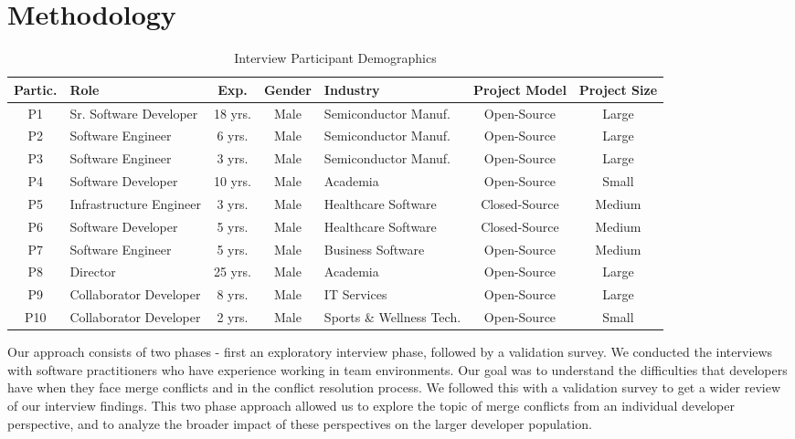 \section{Methodology}\label{methodology}

\begin{table*}[!t]
\renewcommand{\arraystretch}{1.3}
\caption{Interview Participant Demographics}
\label{interview_demographics}
\centering
\begin{tabularx}{\textwidth}{@{}cl*{2}{C}l*{2}{C}}
\toprule
	\textbf{Partic.} & \textbf{Role} & \textbf{Exp.} & \textbf{Gender} & \textbf{Industry} & \textbf{Project Model} & \textbf{Project Size}\\
\midrule
	P1 & Sr. Software Developer & 18 yrs. & Male & Semiconductor Manuf. & Open-Source & Large\\
	P2 & Software Engineer & 6 yrs. & Male & Semiconductor Manuf. & Open-Source & Large\\
	P3 & Software Engineer & 3 yrs. & Male & Semiconductor Manuf. & Open-Source & Large\\
	P4 & Software Developer & 10 yrs. & Male & Academia & Open-Source & Small\\
	P5 & Infrastructure Engineer & 3 yrs. & Male & Healthcare Software & Closed-Source & Medium\\
	P6 & Software Developer & 5 yrs. & Male & Healthcare Software & Closed-Source & Medium\\
	P7 & Software Engineer & 5 yrs. & Male & Business Software & Open-Source & Medium\\
	P8 & Director & 25 yrs. & Male & Academia & Open-Source & Large\\
	P9 & Collaborator Developer & 8 yrs. & Male & IT Services & Open-Source & Large\\
	P10 & Collaborator Developer & 2 yrs. & Male & Sports \& Wellness Tech. & Open-Source & Small\\
\bottomrule
\end{tabularx}
\end{table*}

Our approach consists of two phases - first an exploratory interview phase, followed by a validation survey. We conducted the interviews with software practitioners who have experience working in team environments. Our goal was to understand the difficulties that developers have when they face merge conflicts and in the conflict resolution process. We followed this with a validation survey to get a wider review of our interview findings.
This two phase approach allowed us to explore the topic of merge conflicts from an individual developer perspective, and to analyze the broader impact of these perspectives on the larger developer population.

